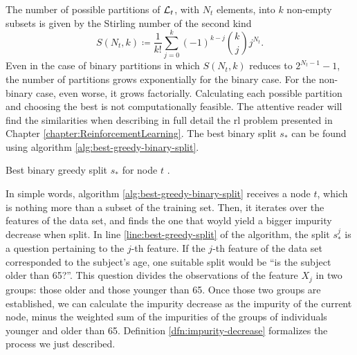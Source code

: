 The number of possible partitions of $\mathcal{L}_t$, with $N_t$ elements, into $k$
non-empty subsets is given by the Stirling number of the second kind
\cite{louppe2014}
\[
    S(N_t, k) \coloneqq \frac{1}{k!} \sum_{j=0}^{k} (-1)^{k-j} \binom{k}{j} j^{N_t}.
\]
Even in the case of binary partitions in which $S(N_t, k)$ reduces to $2^{N_t
-1}-1$, the number of partitions grows exponentially for the binary case. For
the non-binary case, even worse, it grows factorially. Calculating each possible
partition and choosing the best is not computationally feasible. The attentive
reader will find the similarities when describing in full detail the \ac{rl}
problem presented in Chapter \ref{chapter:ReinforcementLearning}. The best
binary split $s_*$ can be found using algorithm
\ref{alg:best-greedy-binary-split}.

\begin{algorithm}
    \caption[Best binary, greedy, split for node $t$.]{Best binary greedy split $s_*$ for node $t$ \cite[Ch.~3.6.3]{louppe2014}.}
    \label{alg:best-greedy-binary-split}
\end{algorithm}

In simple words, algorithm \ref{alg:best-greedy-binary-split} receives a node
$t$, which is nothing more than a subset of the training set. Then, it iterates
over the features of the data set, and finds the one that woyld yield a bigger
impurity decrease when split. In line \ref{line:best-greedy-split} of the
algorithm, the split $s_{*}^{j}$ is a question pertaining to the $j$-th feature.
If the $j$-th feature of the data set corresponded to the subject's age, one
suitable split would be ``is the subject older than 65?''. This question divides
the observations of the feature $X_j$ in two groups: those older and those
younger than 65. Once those two groups are established, we can calculate the
impurity decrease as the impurity of the current node, minus the weighted sum of
the impurities of the groups of individuals younger and older than 65.
Definition \ref{dfn:impurity-decrease} formalizes the process we just described.

